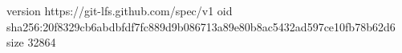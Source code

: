 version https://git-lfs.github.com/spec/v1
oid sha256:20f8329cb6abdbfdf7fc889d9b086713a89e80b8ac5432ad597ce10fb78b62d6
size 32864
